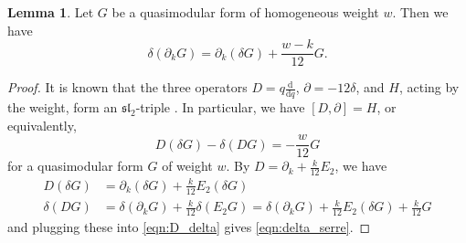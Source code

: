 \documentclass[10pt,reqno]{amsproc}
\newcommand{\dd}{\mathrm{d}}
\newcommand{\1}{\mathds{1}}	%
\theoremstyle{definition}
\newtheorem{lemma}[theorem]{Lemma}
\theoremstyle{remark}
\begin{document}
\begin{lemma}
    \label{lem:delta_serre}
    Let $G$ be a quasimodular form of homogeneous weight $w$.
    Then we have
    \begin{equation}
        \label{eqn:delta_serre}
        \delta(\partial_k G) = \partial_k(\delta G) + \frac{w-k}{12} G.
    \end{equation}
\end{lemma}
\begin{proof}
    It is known that the three operators $D = q \frac{\dd}{\dd q}$, $\partial = -12\delta$, and $H$, acting by the weight, form an $\mathfrak{sl}_2$-triple \cite[p. 468]{kaneko2006extremal}.
    In particular, we have $[D, \partial] = H$, or equivalently,
    \begin{equation}
        \label{eqn:D_delta}
        D(\delta G) - \delta(DG) = -\frac{w}{12} G
    \end{equation}
    for a quasimodular form $G$ of weight $w$.
    By $D = \partial_k + \frac{k}{12} E_2$, we have
    \begin{align*}
        D(\delta G) &= \partial_k (\delta G) + \frac{k}{12} E_2(\delta G) \\
        \delta(DG) &= \delta(\partial_k G) + \frac{k}{12} \delta(E_2 G) = \delta(\partial_k G) + \frac{k}{12} E_2(\delta G) + \frac{k}{12} G
    \end{align*}
    and plugging these into \eqref{eqn:D_delta} gives \eqref{eqn:delta_serre}.
\end{proof}
\end{document}
